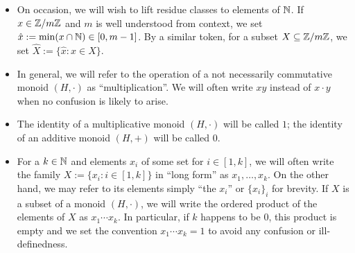 \begin{itemize}
	\item On occasion, we will wish to lift residue classes to elements of $\mathbb{N}$.  
	If $x\in \mathbb{Z}/m\mathbb{Z}$ and $m$ is well understood from context, we set $\hat{x} := \min(x\cap \mathbb{N}) \in [0,m-1]$.
	By a similar token, for a subset $X\subseteq \mathbb{Z}/m\mathbb{Z}$, we set $\hat{X} := \{\hat{x}: x\in X\}$.
	
	\item In general, we will refer to the operation of a not necessarily commutative monoid $(H,\cdot)$ as ``multiplication''.
	We will often write $xy$ instead of $x\cdot y$ when no confusion is likely to arise.
	
	\item The identity of a multiplicative monoid $(H,\cdot)$ will be called $1$; the identity of an additive monoid $(H,+)$ will be called $0$.
	
	\item For a $k\in \mathbb{N}$ and elements $x_i$ of some set for $i\in [1,k]$, we will often write the family $X:=\{x_i: i\in [1,k]\}$ in ``long form'' as $x_1,\dots,x_k$.
	On the other hand, we may refer to its elements simply ``the $x_i$'' or $\{x_i\}_i$ for brevity.
	If $X$ is a subset of a monoid $(H,\cdot)$, we will write the ordered product of the elements of $X$ as $x_1\cdots x_k$.
	In particular, if $k$ happens to be $0$, this product is empty and we set the convention $x_1\cdots x_k = 1$ to avoid any confusion or ill-definedness.
\end{itemize}




